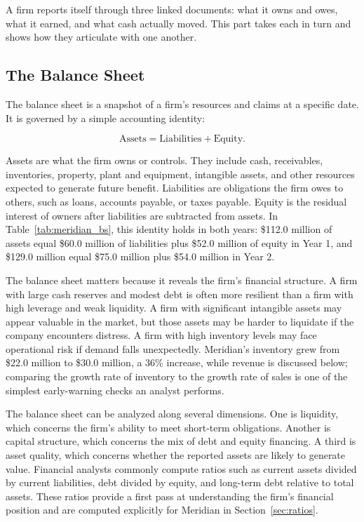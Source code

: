 \documentclass[../ai_in_finance]{subfiles}
\begin{document}
A firm reports itself through three linked documents: what it owns and owes, what it earned, and what cash actually moved. This part takes each in turn and shows how they articulate with one another.

\subsection{The Balance Sheet}

The balance sheet is a snapshot of a firm's resources and claims at a specific date. It is governed by a simple accounting identity:

\begin{equation*}
\text{Assets} = \text{Liabilities} + \text{Equity}.
\end{equation*}

Assets are what the firm owns or controls. They include cash, receivables, inventories, property, plant and equipment, intangible assets, and other resources expected to generate future benefit. Liabilities are obligations the firm owes to others, such as loans, accounts payable, or taxes payable. Equity is the residual interest of owners after liabilities are subtracted from assets. In Table~\ref{tab:meridian_bs}, this identity holds in both years: \$112.0 million of assets equal \$60.0 million of liabilities plus \$52.0 million of equity in Year 1, and \$129.0 million equal \$75.0 million plus \$54.0 million in Year 2.

The balance sheet matters because it reveals the firm's financial structure. A firm with large cash reserves and modest debt is often more resilient than a firm with high leverage and weak liquidity. A firm with significant intangible assets may appear valuable in the market, but those assets may be harder to liquidate if the company encounters distress. A firm with high inventory levels may face operational risk if demand falls unexpectedly. Meridian's inventory grew from \$22.0 million to \$30.0 million, a 36\% increase, while revenue is discussed below; comparing the growth rate of inventory to the growth rate of sales is one of the simplest early-warning checks an analyst performs.

The balance sheet can be analyzed along several dimensions. One is liquidity, which concerns the firm's ability to meet short-term obligations. Another is capital structure, which concerns the mix of debt and equity financing. A third is asset quality, which concerns whether the reported assets are likely to generate value. Financial analysts commonly compute ratios such as current assets divided by current liabilities, debt divided by equity, and long-term debt relative to total assets. These ratios provide a first pass at understanding the firm's financial position and are computed explicitly for Meridian in Section~\ref{sec:ratios}.
\end{document}
